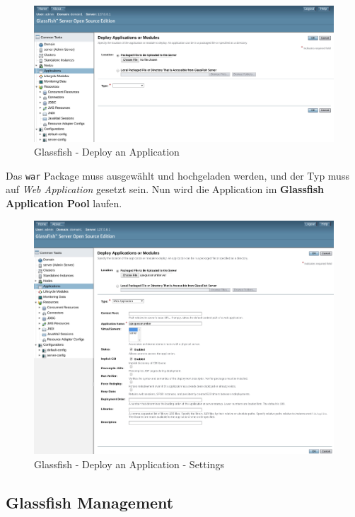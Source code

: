 \begin{figure}
    \centering
    \includegraphics[width=\textwidth]{images/glassfish-deploy}
    \caption{Glassfish - Deploy an Application}
\end{figure}

Das \texttt{war} Package muss ausgewählt und hochgeladen werden, und der Typ muss auf \textit{Web Application} gesetzt sein. Nun wird die Application im \textbf{Glassfish Application Pool} laufen.

\begin{figure}
    \centering
    \includegraphics[width=\textwidth]{images/glassfish-deploy-war}
    \caption{Glassfish - Deploy an Application - Settings}
\end{figure}

\subsection{Glassfish Management}

